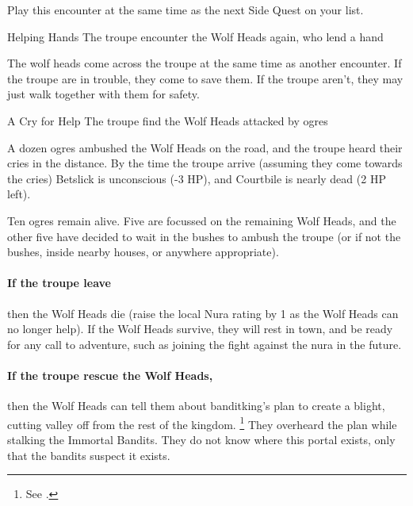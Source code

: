 Play this encounter at the same time as the next Side Quest on your list.

{\squash Helping Hands}%
{The troupe encounter the Wolf Heads again, who lend a hand}%

The wolf heads come across the troupe at the same time as another encounter.
If the troupe are in trouble, they come to save them.
If the troupe aren't, they may just walk together with them for safety.

{A Cry for Help}%
{The troupe find the Wolf Heads attacked by ogres}%

A dozen ogres ambushed the Wolf Heads on the road, and the troupe heard their cries in the distance.
By the time the troupe arrive (assuming they come towards the cries) Betslick is unconscious (-3 HP), and Courtbile is nearly dead (2 HP left).

Ten ogres remain alive.
Five are focussed on the remaining Wolf Heads, and the other five have decided to wait in the bushes to ambush the troupe (or if not the bushes, inside nearby houses, or anywhere appropriate).

\paragraph{\N If the troupe leave}
then the Wolf Heads die (raise the local Nura rating by 1 as the Wolf Heads can no longer help).
If the Wolf Heads survive, they will rest in \gls{town}, and be ready for any call to adventure, such as joining the fight against the nura in the future.

\paragraph{If the troupe rescue the Wolf Heads,}
then the Wolf Heads can tell them about \gls{banditking}'s plan to create a blight, cutting \gls{valley} off from the rest of the kingdom.%
\footnote{See .}
They overheard the plan while stalking the Immortal Bandits.
They do not know where this portal exists, only that the bandits suspect it exists.



\stopcontents[sq]


